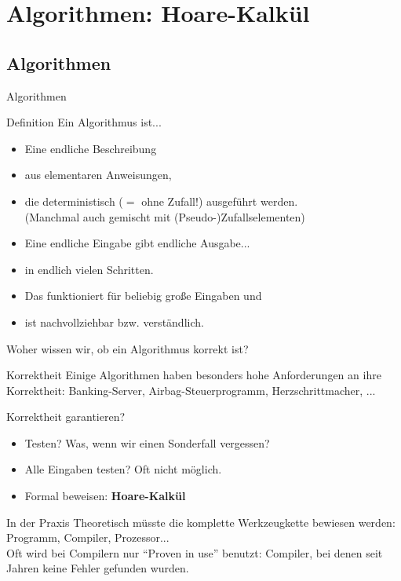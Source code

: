 \renewcommand{\assert}[1]{\hoareassert{#1}}
\renewcommand{\kw}[1]{\textbf{#1}}

\section{Algorithmen: Hoare-Kalkül}

\subsection{Algorithmen}
\begin{frame}{Algorithmen}
	\begin{block}{Definition}
		Ein Algorithmus ist...
		\begin{itemize}[<+->]
			\item Eine endliche Beschreibung
			\item aus elementaren Anweisungen, 
			\item die deterministisch ($=$ ohne Zufall!) ausgeführt werden.\\
				{\small (Manchmal auch gemischt mit (Pseudo-)Zufallselementen)}
			\item Eine endliche Eingabe gibt endliche Ausgabe...
			\item in endlich vielen Schritten.
			\item Das funktioniert für beliebig große Eingaben und
			\item ist nachvollziehbar bzw. verständlich.
		\end{itemize}
	\end{block}
	\pause[8]
	Woher wissen wir, ob ein Algorithmus korrekt ist?
\end{frame}

\begin{frame}{Korrektheit}
	Einige Algorithmen haben besonders hohe Anforderungen an ihre Korrektheit:
	Banking-Server, Airbag-Steuerprogramm, Herzschrittmacher, ...
	\bigskip

	
	Korrektheit garantieren?\pause
	\begin{itemize}
		\item Testen? \pause Was, wenn wir einen Sonderfall vergessen? \pause
		\item Alle Eingaben testen? \pause Oft nicht möglich. \pause
		\item Formal beweisen: \textbf{Hoare-Kalkül} \pause
	\end{itemize}
	
	\begin{block}{In der Praxis}
		Theoretisch müsste die komplette Werkzeugkette bewiesen werden:
		Programm, Compiler, Prozessor...\\
		Oft wird bei Compilern nur “Proven in use” benutzt: Compiler, bei
		denen seit Jahren keine Fehler gefunden wurden.
	\end{block}
	
\end{frame}

